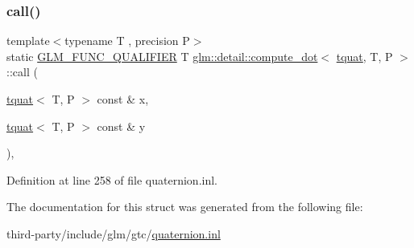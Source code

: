 \subsubsection{\texorpdfstring{call()}{call()}}
{\footnotesize\ttfamily template$<$typename T , precision P$>$ \\
static \hyperlink{setup_8hpp_a33fdea6f91c5f834105f7415e2a64407}{G\+L\+M\+\_\+\+F\+U\+N\+C\+\_\+\+Q\+U\+A\+L\+I\+F\+I\+ER} T \hyperlink{structglm_1_1detail_1_1compute__dot}{glm\+::detail\+::compute\+\_\+dot}$<$ \hyperlink{structglm_1_1detail_1_1tquat}{tquat}, T, P $>$\+::call (\begin{DoxyParamCaption}\item[{\hyperlink{structglm_1_1detail_1_1tquat}{tquat}$<$ T, P $>$ const \&}]{x,  }\item[{\hyperlink{structglm_1_1detail_1_1tquat}{tquat}$<$ T, P $>$ const \&}]{y }\end{DoxyParamCaption})\hspace{0.3cm}{\ttfamily [inline]}, {\ttfamily [static]}}



Definition at line 258 of file quaternion.\+inl.



The documentation for this struct was generated from the following file\+:\begin{DoxyCompactItemize}
\item 
third-\/party/include/glm/gtc/\hyperlink{gtc_2quaternion_8inl}{quaternion.\+inl}\end{DoxyCompactItemize}

